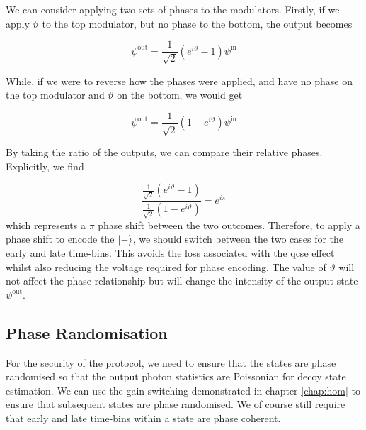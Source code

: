 We can consider applying two sets of phases to the modulators. Firstly, if we apply $\vartheta$ to the top modulator, but no phase to the bottom, the output becomes

\begin{parahigh}
\begin{equation}
	\psi^\mathrm{out} =  \frac{1}{\sqrt{2}}\left(e^{i\vartheta} -1\right) \psi^\mathrm{in}
\end{equation}
\end{parahigh}
While, if we were to reverse how the phases were applied, and have no phase on the top modulator and $\vartheta$ on the bottom, we would get

\begin{parahigh}
\begin{equation}
	\psi^\mathrm{out} =  \frac{1}{\sqrt{2}}\left(1 - e^{i\vartheta}\right) \psi^\mathrm{in}
\end{equation}
\end{parahigh}
By taking the ratio of the outputs, we can compare their relative phases. Explicitly, we find

\begin{parahigh}
\begin{equation}
	\frac{\frac{1}{\sqrt{2}}\left(e^{i\vartheta} -1\right)}{\frac{1}{\sqrt{2}}\left(1 - e^{i\vartheta}\right)} = e^{i\pi}
\end{equation}
which represents a $\pi$ phase shift between the two outcomes. Therefore, to apply a phase shift to encode the $\ket{-}$, we should switch between the two cases for the early and late time-bins. This avoids the loss associated with the \ac{qcse} effect whilst also reducing the voltage required for phase encoding. The value of $\vartheta$ will not affect the phase relationship but will change the intensity of the output state $\psi^\mathrm{out}$. 
\end{parahigh}


\subsection{Phase Randomisation}

For the security of the protocol, we need to ensure that the states are phase randomised so that the output photon statistics are Poissonian for decoy state estimation. We can use the gain switching demonstrated in chapter \ref{chap:hom} to ensure that subsequent states are phase randomised. We of course still require that early and late time-bins within a state are phase coherent. 

